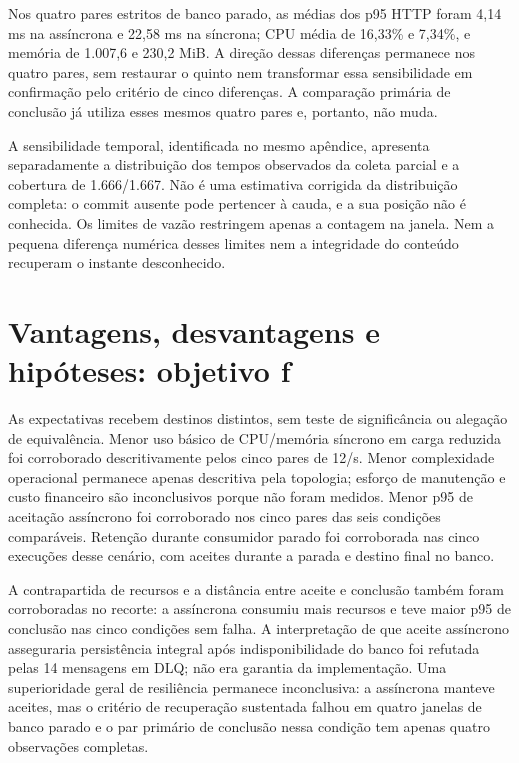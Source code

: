 Nos quatro pares estritos de banco parado, as médias dos p95 HTTP foram 4,14 ms na assíncrona e 22,58 ms na síncrona; CPU média de 16,33\% e 7,34\%, e memória de 1.007,6 e 230,2 MiB. A direção dessas diferenças permanece nos quatro pares, sem restaurar o quinto nem transformar essa sensibilidade em confirmação pelo critério de cinco diferenças. A comparação primária de conclusão já utiliza esses mesmos quatro pares e, portanto, não muda.

A sensibilidade temporal, identificada no mesmo apêndice, apresenta separadamente a distribuição dos tempos observados da coleta parcial e a cobertura de 1.666/1.667. Não é uma estimativa corrigida da distribuição completa: o commit ausente pode pertencer à cauda, e a sua posição não é conhecida. Os limites de vazão restringem apenas a contagem na janela. Nem a pequena diferença numérica desses limites nem a integridade do conteúdo recuperam o instante desconhecido.



\section{Vantagens, desvantagens e hipóteses: objetivo f}
As expectativas recebem destinos distintos, sem teste de significância ou alegação de equivalência. Menor uso básico de CPU/memória síncrono em carga reduzida foi corroborado descritivamente pelos cinco pares de 12/s. Menor complexidade operacional permanece apenas descritiva pela topologia; esforço de manutenção e custo financeiro são inconclusivos porque não foram medidos. Menor p95 de aceitação assíncrono foi corroborado nos cinco pares das seis condições comparáveis. Retenção durante consumidor parado foi corroborada nas cinco execuções desse cenário, com aceites durante a parada e destino final no banco.

A contrapartida de recursos e a distância entre aceite e conclusão também foram corroboradas no recorte: a assíncrona consumiu mais recursos e teve maior p95 de conclusão nas cinco condições sem falha. A interpretação de que aceite assíncrono asseguraria persistência integral após indisponibilidade do banco foi refutada pelas 14 mensagens em DLQ; não era garantia da implementação. Uma superioridade geral de resiliência permanece inconclusiva: a assíncrona manteve aceites, mas o critério de recuperação sustentada falhou em quatro janelas de banco parado e o par primário de conclusão nessa condição tem apenas quatro observações completas.

